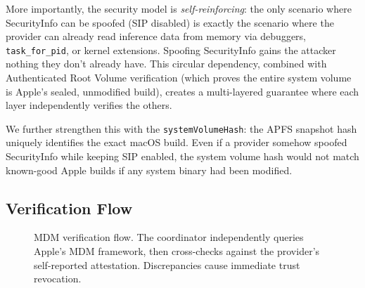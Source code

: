 \documentclass[10pt,twocolumn,letterpaper]{article}
\begin{document}
More importantly, the security model is \emph{self-reinforcing}: the only scenario where SecurityInfo can be spoofed (SIP disabled) is exactly the scenario where the provider can already read inference data from memory via debuggers, \texttt{task\_for\_pid}, or kernel extensions. Spoofing SecurityInfo gains the attacker nothing they don't already have. This circular dependency, combined with Authenticated Root Volume verification (which proves the entire system volume is Apple's sealed, unmodified build), creates a multi-layered guarantee where each layer independently verifies the others.

We further strengthen this with the \texttt{systemVolumeHash}: the APFS snapshot hash uniquely identifies the exact macOS build. Even if a provider somehow spoofed SecurityInfo while keeping SIP enabled, the system volume hash would not match known-good Apple builds if any system binary had been modified.

\subsection{Verification Flow}

\begin{figure}[t]
\centering
{}
\caption{MDM verification flow. The coordinator independently queries Apple's MDM framework, then cross-checks against the provider's self-reported attestation. Discrepancies cause immediate trust revocation.}
\label{fig:mdm}
\end{figure}
\end{document}
